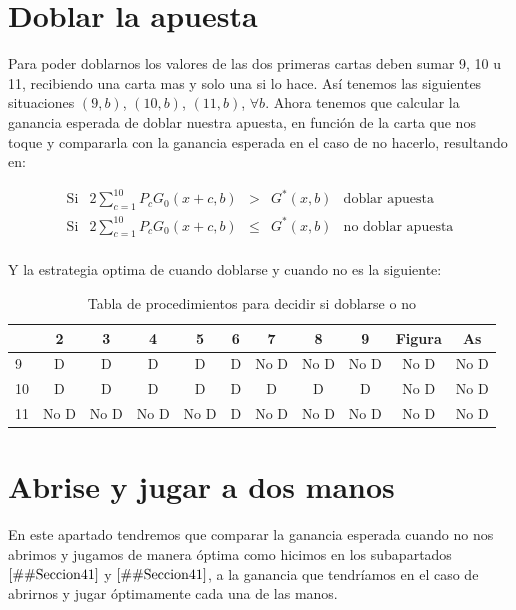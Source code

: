 \documentclass[12pt,a4paper,]{book}
\numberwithin{dummy}{section}
\theoremstyle{ocrenumbox}
\theoremstyle{blacknumex}
\theoremstyle{blacknumbox}
\theoremstyle{ocrenum}
\theoremstyle{ocrenum}
\begin{document}
\hypertarget{Seccion43}{%
\section{Doblar la apuesta}\label{Seccion43}}

Para poder doblarnos los valores de las dos primeras cartas deben sumar
9, 10 u 11, recibiendo una carta mas y solo una si lo hace. Así tenemos
las siguientes situaciones \((9,b)\), \((10,b)\), \((11,b)\),
\(\forall b\). Ahora tenemos que calcular la ganancia esperada de doblar
nuestra apuesta, en función de la carta que nos toque y compararla con
la ganancia esperada en el caso de no hacerlo, resultando en:

\[
\begin{array}{cllll}
\text{Si} & 2 \sum_{c=1}^{10}P_cG_0(x+c,b) & > & G^*(x,b) & \text{doblar apuesta} \\
\text{Si} & 2 \sum_{c=1}^{10}P_cG_0(x+c,b) & \leq & G^*(x,b) & \text{no doblar apuesta}\\
\end{array}
\]

Y la estrategia optima de cuando doblarse y cuando no es la siguiente:

\begingroup\fontsize{12}{14}\selectfont

\begin{longtable}[t]{lcccccccccc}
\caption{\label{tab:unnamed-chunk-42}Tabla de procedimientos para decidir si doblarse o no}\\
\toprule
 & 2 & 3 & 4 & 5 & 6 & 7 & 8 & 9 & Figura & As\\
\midrule
9 & D & D & D & D & D & No D & No D & No D & No D & No D\\
10 & D & D & D & D & D & D & D & D & No D & No D\\
11 & No D & No D & No D & No D & D & No D & No D & No D & No D & No D\\
\bottomrule
\end{longtable}
\endgroup{}

\hypertarget{Seccion44}{%
\section{Abrise y jugar a dos manos}\label{Seccion44}}

En este apartado tendremos que comparar la ganancia esperada cuando no
nos abrimos y jugamos de manera óptima como hicimos en los subapartados
\(\ref{#Seccion41}\) y \(\ref{#Seccion41}\), a la ganancia que
tendríamos en el caso de abrirnos y jugar óptimamente cada una de las
manos.
\end{document}
